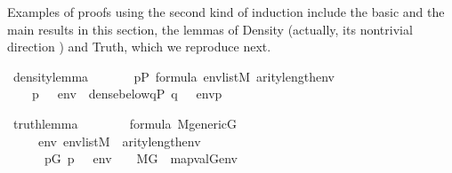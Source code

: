 Examples of proofs  using the second kind of induction include
the basic  and the main
results in this section, the lemmas of  Density  (actually, its nontrivial
direction
)
and Truth, 
which we reproduce next.
%
\begin{isabelle}
\isamarkupfalse%
\ density{\isacharunderscore}lemma{\isacharcolon}\isanewline
\ \ \isanewline
\ \ \ \ {\isachardoublequoteopen}p{\isasymin}P{\isachardoublequoteclose}\ {\isachardoublequoteopen}{\isasymphi}{\isasymin}formula{\isachardoublequoteclose}\ {\isachardoublequoteopen}env{\isasymin}list{\isacharparenleft}M{\isacharparenright}{\isachardoublequoteclose}\ {\isachardoublequoteopen}arity{\isacharparenleft}{\isasymphi}{\isacharparenright}{\isasymle}length{\isacharparenleft}env{\isacharparenright}{\isachardoublequoteclose}\isanewline
\ \ \isanewline
\ \ \ \ {\isachardoublequoteopen}{\isacharparenleft}p\ {\isasymtturnstile}\ {\isasymphi}\ env{\isacharparenright}\ {\isasymlongleftrightarrow}\ dense{\isacharunderscore}below{\isacharparenleft}{\isacharbraceleft}q{\isasymin}P{\isachardot}\ {\isacharparenleft}q\ {\isasymtturnstile}\ {\isasymphi}\ env{\isacharparenright}{\isacharbraceright}{\isacharcomma}p{\isacharparenright}{\isachardoublequoteclose}
\end{isabelle}
\begin{isabelle}
\isamarkupfalse%
\ truth{\isacharunderscore}lemma{\isacharcolon}\isanewline
\ \ \ \isanewline
\ \ \ \ {\isachardoublequoteopen}{\isasymphi}{\isasymin}formula{\isachardoublequoteclose}\ {\isachardoublequoteopen}M{\isacharunderscore}generic{\isacharparenleft}G{\isacharparenright}{\isachardoublequoteclose}\isanewline
\ \ \ \isanewline
\ \ \ \ \ {\isachardoublequoteopen}{\isasymAnd}env{\isachardot}\ env{\isasymin}list{\isacharparenleft}M{\isacharparenright}\ {\isasymLongrightarrow}\ arity{\isacharparenleft}{\isasymphi}{\isacharparenright}{\isasymle}length{\isacharparenleft}env{\isacharparenright}\ {\isasymLongrightarrow}\ \isanewline
\ \ \ \ \ \ {\isacharparenleft}{\isasymexists}p{\isasymin}G{\isachardot}\ {\isacharparenleft}p\ {\isasymtturnstile}\ {\isasymphi}\ env{\isacharparenright}{\isacharparenright}\ \ {\isasymlongleftrightarrow}\ \ M{\isacharbrackleft}G{\isacharbrackright}\ {\isacharcomma}\ map{\isacharparenleft}val{\isacharparenleft}G{\isacharparenright}{\isacharcomma}env{\isacharparenright}\ {\isasymTurnstile}\ {\isasymphi}{\isachardoublequoteclose}
\end{isabelle}
